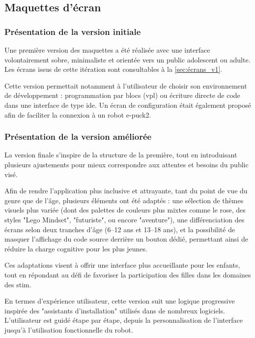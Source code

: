 \subsection{Maquettes d'écran} \label{sec:maquettes_ecran}

\subsubsection{Présentation de la version initiale}
Une première version des maquettes a été réalisée avec une interface volontairement sobre, minimaliste et orientée vers un public adolescent ou adulte. 
Les écrans issus de cette itération sont consultables à la \autoref{sec:écrans_v1}.

Cette version permettait notamment à l'utilisateur de choisir son environnement de développement : programmation par blocs (\acrshort{vpl}) ou écriture directe de code dans une interface de type \acrfull{ide}. 
Un écran de configuration était également proposé afin de faciliter la connexion à un robot e-puck2.

\subsubsection{Présentation de la version améliorée}
La version finale s'inspire de la structure de la première, tout en introduisant plusieurs ajustements pour mieux correspondre aux attentes et besoins du public visé.

Afin de rendre l'application plus inclusive et attrayante, tant du point de vue du genre que de l'âge, plusieurs éléments ont été adaptés : une sélection de thèmes visuels plus variée (dont des palettes de couleurs plus mixtes comme le rose, des styles "Lego Mindset", "futuriste", ou encore "aventure"), une différenciation des écrans selon deux tranches d'âge (6–12 ans et 13–18 ans), et la possibilité de masquer l'affichage du code source derrière un bouton dédié, permettant ainsi de réduire la charge cognitive pour les plus jeunes.

Ces adaptations visent à offrir une interface plus accueillante pour les enfants, tout en répondant au défi de favoriser la participation des filles dans les domaines des \acrfull{stim}.

En termes d’expérience utilisateur, cette version suit une logique progressive inspirée des "assistants d'installation" utilisés dans de nombreux logiciels. 
L'utilisateur est guidé étape par étape, depuis la personnalisation de l’interface jusqu’à l’utilisation fonctionnelle du robot.

